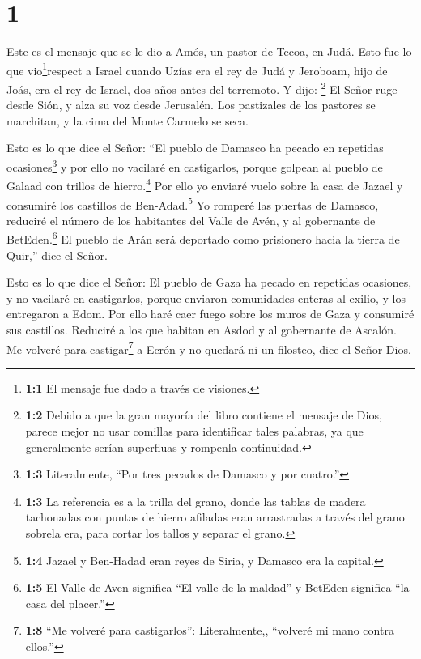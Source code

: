 \hypertarget{section}{%
\section{1}\label{section}}

 Este es el mensaje que se le dio a Amós, un pastor de
Tecoa, en Judá. Esto fue lo que vio\footnote{\textbf{1:1} El mensaje fue
  dado a través de visiones.}respect a Israel cuando Uzías era el rey de
Judá y Jeroboam, hijo de Joás, era el rey de Israel, dos años antes del
terremoto.  Y dijo: \footnote{\textbf{1:2} Debido a que la
  gran mayoría del libro contiene el mensaje de Dios, parece mejor no
  usar comillas para identificar tales palabras, ya que generalmente
  serían superfluas y rompenla continuidad.} El Señor ruge desde Sión, y
alza su voz desde Jerusalén. Los pastizales de los pastores se
marchitan, y la cima del Monte Carmelo se seca.

 Esto es lo que dice el Señor: ``El pueblo de Damasco ha
pecado en repetidas ocasiones\footnote{\textbf{1:3} Literalmente, ``Por
  tres pecados de Damasco y por cuatro.''} y por ello no vacilaré en
castigarlos, porque golpean al pueblo de Galaad con trillos de
hierro.\footnote{\textbf{1:3} La referencia es a la trilla del grano,
  donde las tablas de madera tachonadas con puntas de hierro afiladas
  eran arrastradas a través del grano sobrela era, para cortar los
  tallos y separar el grano.}  Por ello yo enviaré vuelo
sobre la casa de Jazael y consumiré los castillos de
Ben-Adad.\footnote{\textbf{1:4} Jazael y Ben-Hadad eran reyes de Siria,
  y Damasco era la capital.}  Yo romperé las puertas de
Damasco, reduciré el número de los habitantes del Valle de Avén, y al
gobernante de BetEden.\footnote{\textbf{1:5} El Valle de Aven significa
  ``El valle de la maldad'' y BetEden significa ``la casa del placer.''}
El pueblo de Arán será deportado como prisionero hacia la tierra de
Quir,'' dice el Señor.

 Esto es lo que dice el Señor: El pueblo de Gaza ha pecado
en repetidas ocasiones, y no vacilaré en castigarlos, porque enviaron
comunidades enteras al exilio, y los entregaron a Edom.  Por
ello haré caer fuego sobre los muros de Gaza y consumiré sus castillos.
 Reduciré a los que habitan en Asdod y al gobernante de
Ascalón. Me volveré para castigar\footnote{\textbf{1:8} ``Me volveré
  para castigarlos'': Literalmente,, ``volveré mi mano contra ellos.''}
a Ecrón y no quedará ni un filosteo, dice el Señor Dios.

